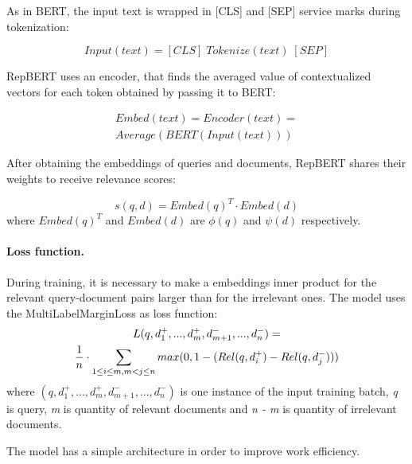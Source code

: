 \documentclass[
    twocolumn,
]{ceurart}
\begin{document}
    As in BERT\cite{BERT}, the input text is wrapped in [CLS] and [SEP] service marks
    during tokenization:

    \begin{equation}
        Input(text) = [CLS]\;Tokenize(text)\;[SEP]
    \end{equation}

    RepBERT uses an encoder, that finds the averaged value of contextualized vectors for each token
    obtained by passing it to BERT:

    \begin{multline}
        Embed(text)=Encoder(text)=\\
        Average(BERT(Input(text)))
    \end{multline}

    After obtaining the embeddings of queries and documents, RepBERT shares their weights
    to receive relevance scores:

    \begin{equation}
        s(q,d) = Embed(q)^T \cdot Embed(d)
    \end{equation}
    where $Embed(q)^T$ and $Embed(d)$ are $\phi(q)$ and $\psi(d)$ respectively.

    \paragraph{Loss function.}
    During training, it is necessary to make a embeddings inner product for the relevant
    query-document pairs larger than for the irrelevant ones.
    The model uses the MultiLabelMarginLoss \cite{multiLabelMarginLoss} as loss function:
    \begin{multline}
        \mathnormal{L}(q,d_1^+,...,d_m^+,d_{m+1}^-,...,d_n^-) = \\
        \frac{1}{n} \cdot \sum_{1 \leq i \leq m,m < j \leq n}
        max(0, 1 - (Rel(q,d_i^+) - Rel(q,d_j^-)))
    \end{multline}
    where $(q,d_1^+,...,d_m^+,d_{m+1}^-,...,d_n^-)$ is one instance of the input training batch,
    \emph{q} is query, \emph{m} is quantity of relevant documents and \emph{n - m} is quantity
    of irrelevant documents\cite{RepBERT}.\\\par
    The model has a simple architecture in order to improve work efficiency.
\end{document}
